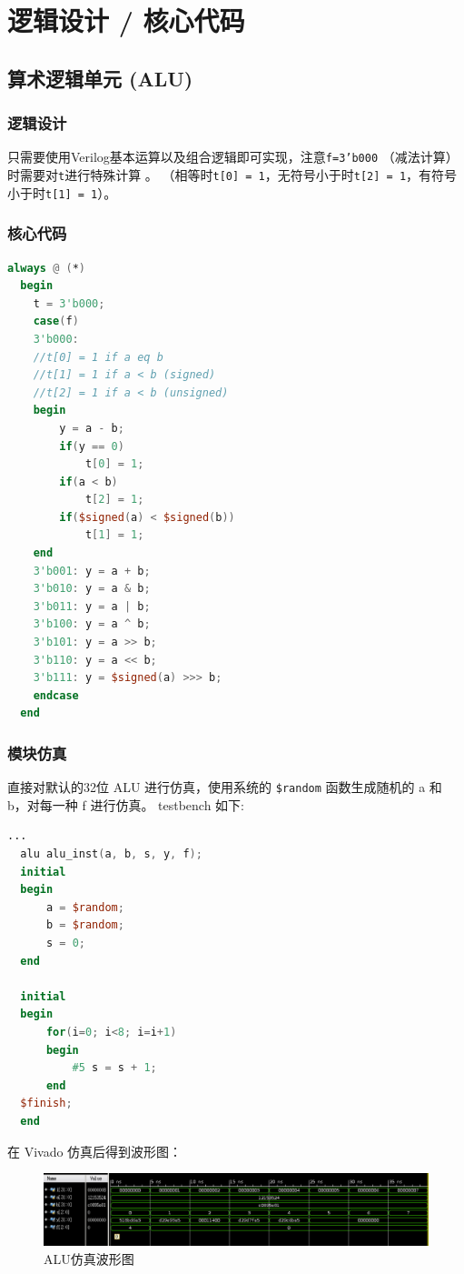 \documentclass[a4paper]{article}
\begin{document}
\section{逻辑设计 / 核心代码}
\subsection{算术逻辑单元 (ALU) }
\subsubsection{逻辑设计}
只需要使用Verilog基本运算以及组合逻辑即可实现，注意\texttt{f=3'b000} （减法计算）时需要对\texttt{t}进行特殊计算
。
（相等时\texttt{t[0] = 1}，无符号小于时\texttt{t[2] = 1}，有符号小于时\texttt{t[1] = 1}）。

\subsubsection{核心代码}
\begin{lstlisting}[language={verilog},title={alu.v}] 
  always @ (*)
  begin
    t = 3'b000;
    case(f)
    3'b000: 
    //t[0] = 1 if a eq b
    //t[1] = 1 if a < b (signed)
    //t[2] = 1 if a < b (unsigned)
    begin
        y = a - b; 
        if(y == 0)
            t[0] = 1;
        if(a < b)
            t[2] = 1;
        if($signed(a) < $signed(b))
            t[1] = 1;
    end
    3'b001: y = a + b;
    3'b010: y = a & b;
    3'b011: y = a | b;
    3'b100: y = a ^ b;
    3'b101: y = a >> b;
    3'b110: y = a << b;
    3'b111: y = $signed(a) >>> b; 
    endcase
  end
\end{lstlisting}

\subsubsection{模块仿真}
直接对默认的32位 ALU 进行仿真，使用系统的 \texttt{\$random} 函数生成随机的 a 和 b，对每一种 f 进行仿真。 
testbench 如下:
\begin{lstlisting}[language={verilog},title={alu.v}] 
  ...
  alu alu_inst(a, b, s, y, f);
  initial 
  begin
      a = $random;
      b = $random;
      s = 0;
  end

  initial
  begin
      for(i=0; i<8; i=i+1)
      begin
          #5 s = s + 1;
      end
  $finish;
  end
\end{lstlisting}
在 Vivado 仿真后得到波形图：
\begin{figure}[H]
  \centering
  \includegraphics[width=1.0\textwidth]{alu_sim.png}
  \caption{ALU仿真波形图}
  \label{fig:alu}
\end{figure}
\end{document}
